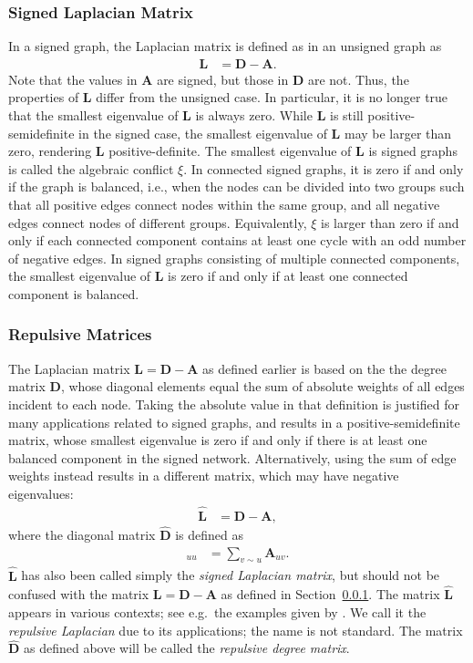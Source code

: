 \documentclass{article}
\begin{document}
\subsubsection{Signed Laplacian Matrix}
\label{sec:decomposition:lap:signed}
In a signed graph, the Laplacian matrix is defined as in an unsigned
graph as
\begin{align*}
  \mathbf L &= \mathbf D - \mathbf A.
\end{align*}
Note that the values in $\mathbf A$ are signed, but those in $\mathbf D$
are not.  Thus, the properties of $\mathbf L$ differ from the unsigned
case.  In particular, it is no longer true that the smallest eigenvalue
of $\mathbf L$ is always zero.  While $\mathbf L$ is still
positive-semidefinite in the signed case, 
the smallest eigenvalue of $\mathbf L$ may be larger than zero,
rendering $\mathbf L$ positive-definite. 
The smallest eigenvalue of $\mathbf L$ is signed graphs is called 
the algebraic conflict $\xi$.  In connected signed graphs, it is zero if and only if the graph is balanced,
i.e., when the nodes can be divided into two groups such that all
positive edges connect nodes within the same group, and all negative
edges connect nodes of different groups.  Equivalently, $\xi$ is larger
than zero if and only if each connected component contains at least one
cycle with an odd number of negative edges. 
In signed graphs consisting of multiple connected components, the
smallest eigenvalue of $\mathbf L$ is zero if and only if at least one
connected component is balanced.  

\subsubsection{Repulsive Matrices}
\label{sec:matrix.repulsive}
The Laplacian matrix $\mathbf L = \mathbf D - \mathbf A$ as defined
earlier is based on the the degree matrix $\mathbf D$, whose diagonal
elements equal the sum of absolute weights of all edges incident to each
node.  
Taking the absolute value in that definition is justified for
many applications related to signed graphs, and results in a positive-semidefinite matrix, whose
smallest eigenvalue is zero if and only if there is at least one
balanced component in the signed network.  Alternatively, using the sum
of edge weights instead results in a different matrix, which may have
negative eigenvalues:
\begin{align}
  \mathbf{\hat L} &= \mathbf{\hat D} - \mathbf A,
\end{align}
where the diagonal matrix $\mathbf{\hat D}$ is defined as
\begin{align*}
  [\mathbf{\hat D}]_{uu} &= \sum_{v \sim u} \mathbf A_{uv}.
\end{align*}
$\mathbf{\hat L}$ has also been called simply the \emph{signed Laplacian
  matrix}, but should not be confused with the matrix $\mathbf L =
\mathbf D - \mathbf A$ as defined in
Section~\ref{sec:decomposition:lap:signed}. 
The matrix $\mathbf{\hat L}$ appears in various contexts; see e.g.\ the
examples given by \cite{b875}.  We call it the \emph{repulsive
  Laplacian} due to its applications; the name is not standard.  The
matrix $\mathbf{\hat D}$ as defined above will be called the
\emph{repulsive degree matrix}. 
\end{document}
